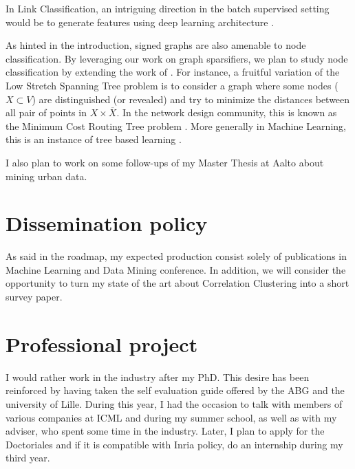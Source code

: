 In Link Classification, an intriguing direction in the batch supervised setting
would be to generate features using deep learning architecture
\autocites{Perozzi2014}{Yanardag2015}.

As hinted in the introduction, signed graphs are also amenable to node
classification. By leveraging our work on graph sparsifiers, we plan
to study node classification by extending the work of \textcite{Vitale2012}.
For instance, a fruitful variation of the Low Stretch Spanning Tree problem is
to consider a graph where some nodes ($X \subset V$) are distinguished (or
revealed) and try to minimize the distances between all pair of points in $X
\times \overline{X}$. In the network design community, this is known as the
Minimum Cost Routing Tree problem \autocites{Johnson1978}{Connamacher2003}.
More generally in Machine Learning, this is an instance of tree based learning
\autocite{cesa2009fast}.

I also plan to work on some follow-ups of my Master Thesis at Aalto
about mining urban data.

\section{Dissemination policy}\label{dissemination-policy}


As said in the roadmap, my expected production consist solely of publications
in Machine Learning and Data Mining conference. In addition, we will consider
the opportunity to turn my state of the art about Correlation Clustering into a
short survey paper.

\section{Professional project}\label{professional-project}


I would rather work in the industry after my PhD. This desire has been
reinforced by having taken the self evaluation guide offered by the ABG and the
university of Lille. During this year, I had the occasion to talk with members
of various companies at ICML and during my summer school, as well as with my
adviser, who spent some time in the industry. Later, I plan to apply for the
Doctoriales and if it is compatible with Inria policy, do an internship during
my third year.

